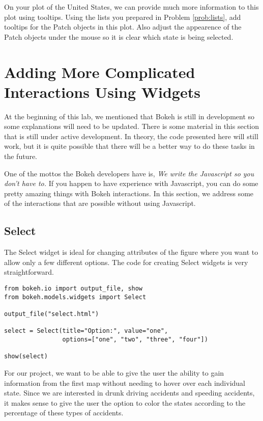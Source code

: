 \begin{problem} 
On your plot of the United States, we can provide much more information to this
plot using tooltips. Using the lists you prepared in Problem \ref{prob:lists},
add tooltips for the Patch objects in this plot. Also adjust the appearence of
the Patch objects under the mouse so it is clear which state is being selected.
\end{problem}

\section*{Adding More Complicated Interactions Using Widgets}
\begin{info}
At the beginning of this lab, we mentioned that Bokeh is still in development
so some explanations will need to be updated. There is some material in this
section that is still under active development. In theory, the code presented
here will still work, but it is quite possible that there will be a better way
to do these tasks in the future.
\end{info}

One of the mottos the Bokeh developers have is, \emph{We write the Javascript so
you don't have to.} If you happen to have experience with Javascript, you can
do some pretty amazing things with Bokeh interactions. In this section, we
address some of the interactions that are possible without using Javascript.

\subsection*{Select}
The Select widget is ideal for changing attributes of the figure where you want
to allow only a few different options. The code for creating Select widgets is
very straightforward.

\begin{lstlisting}
from bokeh.io import output_file, show
from bokeh.models.widgets import Select

output_file("select.html")

select = Select(title="Option:", value="one",
                options=["one", "two", "three", "four"])

show(select)
\end{lstlisting}

For our project, we want to be able to
give the user the ability to gain information from the first map without needing
to hover over each individual state. Since we are interested in drunk driving
accidents and speeding accidents, it makes sense to give the user the option to
color the states according to the percentage of these types of accidents.

